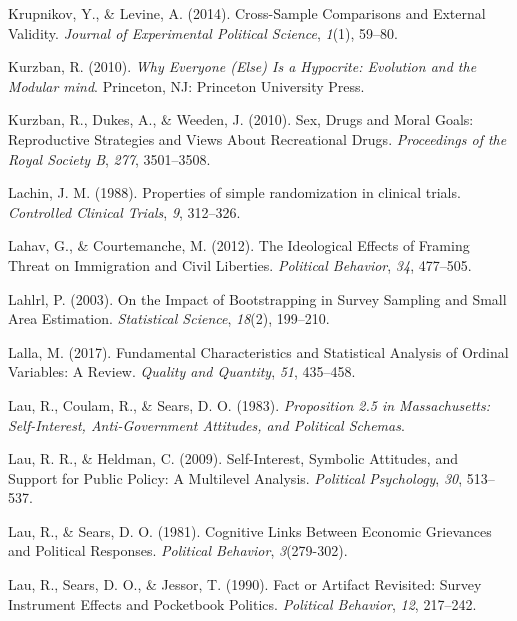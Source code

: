 \documentclass[12pt,econ]{sources/authesis}
\begin{document}
\leavevmode\hypertarget{ref-krupnikov_2014_cross-sample}{}%
Krupnikov, Y., \& Levine, A. (2014). Cross-Sample Comparisons and External Validity. \emph{Journal of Experimental Political Science}, \emph{1}(1), 59--80.

\leavevmode\hypertarget{ref-kurzban_2010_everyone}{}%
Kurzban, R. (2010). \emph{Why Everyone (Else) Is a Hypocrite: Evolution and the Modular mind}. Princeton, NJ: Princeton University Press.

\leavevmode\hypertarget{ref-kurzban_2010_sex}{}%
Kurzban, R., Dukes, A., \& Weeden, J. (2010). Sex, Drugs and Moral Goals: Reproductive Strategies and Views About Recreational Drugs. \emph{Proceedings of the Royal Society B}, \emph{277}, 3501--3508.

\leavevmode\hypertarget{ref-lachin_1988_properties}{}%
Lachin, J. M. (1988). Properties of simple randomization in clinical trials. \emph{Controlled Clinical Trials}, \emph{9}, 312--326.

\leavevmode\hypertarget{ref-lahav_ideological_2012}{}%
Lahav, G., \& Courtemanche, M. (2012). The Ideological Effects of Framing Threat on Immigration and Civil Liberties. \emph{Political Behavior}, \emph{34}, 477--505.

\leavevmode\hypertarget{ref-lahlrl_2003_impact}{}%
Lahlrl, P. (2003). On the Impact of Bootstrapping in Survey Sampling and Small Area Estimation. \emph{Statistical Science}, \emph{18}(2), 199--210.

\leavevmode\hypertarget{ref-lalla_2017_fundamental}{}%
Lalla, M. (2017). Fundamental Characteristics and Statistical Analysis of Ordinal Variables: A Review. \emph{Quality and Quantity}, \emph{51}, 435--458.

\leavevmode\hypertarget{ref-lau_proposition_1983}{}%
Lau, R., Coulam, R., \& Sears, D. O. (1983). \emph{Proposition 2.5 in Massachusetts: Self-Interest, Anti-Government Attitudes, and Political Schemas}.

\leavevmode\hypertarget{ref-lau_2030_self-interest}{}%
Lau, R. R., \& Heldman, C. (2009). Self-Interest, Symbolic Attitudes, and Support for Public Policy: A Multilevel Analysis. \emph{Political Psychology}, \emph{30}, 513--537.

\leavevmode\hypertarget{ref-lau_cognitive_1981}{}%
Lau, R., \& Sears, D. O. (1981). Cognitive Links Between Economic Grievances and Political Responses. \emph{Political Behavior}, \emph{3}(279-302).

\leavevmode\hypertarget{ref-lau_fact_1990}{}%
Lau, R., Sears, D. O., \& Jessor, T. (1990). Fact or Artifact Revisited: Survey Instrument Effects and Pocketbook Politics. \emph{Political Behavior}, \emph{12}, 217--242.
\end{document}
